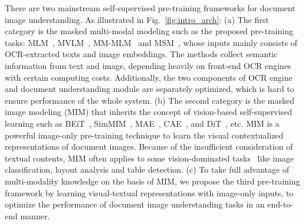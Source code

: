 \documentclass{article} %
\begin{document}
There are two mainstream self-supervised pre-training frameworks for document image understanding. As illustrated in Fig.~\ref{fig:intro_arch}: (a) The first category is the masked multi-modal modeling such as the proposed pre-training tasks: MLM~\cite{devlin2018bert}, MVLM~\cite{xu2020layoutlmv2}, MM-MLM~\cite{appalaraju2021docformer} and MSM~\cite{nips2021udoc}, whose inputs mainly consists of OCR-extracted texts and image embeddings. The methods collect semantic information from text and image, depending heavily on front-end OCR engines with certain computing costs. Additionally, the two components of OCR engine and document understanding module are separately optimized, which is hard to ensure performance of the whole system. (b) The second category is the masked image modeling (MIM) that inherits the concept of vision-based self-supervised learning such as BEiT~\cite{bao2021beit}, SimMIM~\cite{Xie00LBYD022}, MAE~\cite{he2021masked}, CAE~\cite{chen2022context}, and DiT~\cite{li2022dit}, etc. MIM is a powerful image-only pre-training technique to learn the visual contextualized representations of document images. Because of the insufficient consideration of textual contents, MIM often applies to some vision-dominated tasks~\cite{li2022dit} like image classification, layout analysis and table detection. (c) To take full advantage of multi-modality knowledge on the basis of MIM, we propose the third pre-training framework by learning visual-textual representations with image-only inputs, to optimize the performance of document image understanding tasks in an end-to-end manner.
\end{document}
